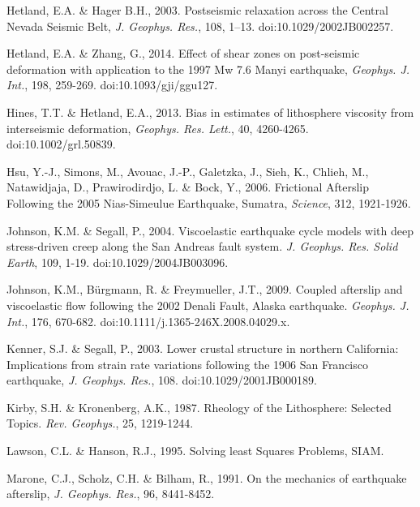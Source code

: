\documentclass[extra,mreferee]{gji}
\begin{document}
\begin{thebibliography}{}
 Hetland, E.A. \& Hager B.H.,
  2003. Postseismic relaxation across the Central Nevada Seismic Belt,
  \textit{J. Geophys. Res.}, 108,
  1–13. doi:10.1029/2002JB002257.

 Hetland, E.A. \& Zhang, G.,
  2014. Effect of shear zones on post-seismic deformation with
  application to the 1997 Mw 7.6 Manyi earthquake, \textit{Geophys. J.
    Int.}, 198, 259-269. doi:10.1093/gji/ggu127.

 Hines, T.T. \&
  Hetland, E.A., 2013. Bias in estimates of lithosphere viscosity from
  interseismic deformation, \textit{Geophys. Res. Lett.}, 40,
  4260-4265. doi:10.1002/grl.50839.

 Hsu, Y.-J., Simons, M., Avouac,
  J.-P., Galetzka, J., Sieh, K., Chlieh, M., Natawidjaja, D.,
  Prawirodirdjo, L. \& Bock, Y., 2006. Frictional Afterslip Following
  the 2005 Nias-Simeulue Earthquake, Sumatra, \textit{Science}, 312,
  1921-1926.

 Johnson, K.M. \& Segall,
  P., 2004. Viscoelastic earthquake cycle models with deep
  stress-driven creep along the San Andreas fault
  system. \textit{J. Geophys.  Res. Solid Earth}, 109,
  1-19. doi:10.1029/2004JB003096.

Johnson, K.M.,
  B\"urgmann, R. \& Freymueller, J.T., 2009. Coupled afterslip and
  viscoelastic flow following the 2002 Denali Fault, Alaska
  earthquake. \textit{Geophys. J.  Int.}, 176,
  670-682. doi:10.1111/j.1365-246X.2008.04029.x.

 Kenner, S.J. \& Segall, P.,
  2003. Lower crustal structure in northern California: Implications
  from strain rate variations following the 1906 San Francisco
  earthquake, \textit{J. Geophys. Res.},
  108. doi:10.1029/2001JB000189.

 Kirby, S.H. \& Kronenberg,
  A.K., 1987. Rheology of the Lithosphere: Selected Topics. \textit{Rev.
  Geophys.}, 25, 1219-1244.

 Lawson, C.L. \&
  Hanson, R.J., 1995. Solving least Squares Problems, SIAM.

 Marone, C.J., Scholz,
  C.H.  \& Bilham, R., 1991. On the mechanics of earthquake
  afterslip, \textit{J. Geophys. Res.}, 96, 8441-8452.


\end{thebibliography}
\end{document}
